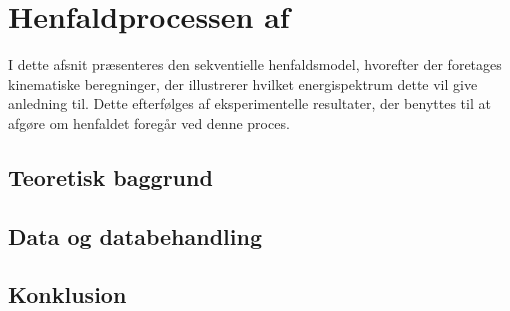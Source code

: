 \chapter{Henfaldprocessen af \Carb}
\label{cha:sekventielt-henfald}
I dette afsnit præsenteres den sekventielle henfaldsmodel, hvorefter der foretages kinematiske
beregninger, der illustrerer hvilket energispektrum dette vil give anledning til. Dette efterfølges
af eksperimentelle resultater, der benyttes til at afgøre om henfaldet foregår ved denne proces.  

\section{Teoretisk baggrund}
\label{sec:sekventiel-teo}







\section{Data og databehandling}
\label{sec:sek-data}





\section{Konklusion}
\label{sec:sekv-konklusion}


